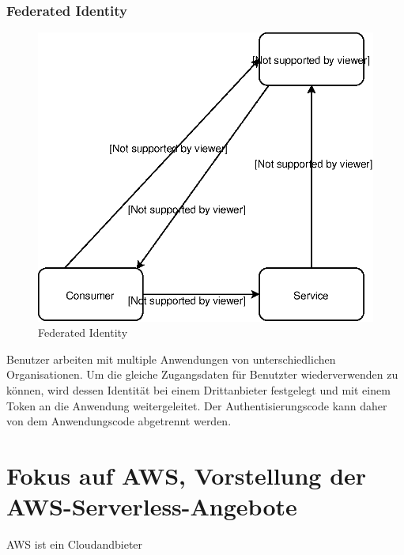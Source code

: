 \documentclass[
12pt,
english,
ngerman,
headsepline,
twoside,
openright,
numbers=noenddot,version=first
]{scrreprt}
\begin{document}
\subsection{Federated Identity}
\begin{figure}
	\includegraphics[scale=0.36]{./pics/pattern-federated-identity.eps}
	\caption{Federated Identity}
	\label{pic:federated-identity}
\end{figure}
Benutzer arbeiten mit multiple Anwendungen von unterschiedlichen Organisationen. Um die gleiche Zugangsdaten für Benutzter wiederverwenden zu können, wird dessen Identität bei einem Drittanbieter festgelegt und mit einem Token an die Anwendung weitergeleitet. Der Authentisierungscode kann daher von dem Anwendungscode abgetrennt werden.

\chapter{Fokus auf AWS, Vorstellung der AWS-Serverless-Angebote}
\label{chap:aws-serverless}
\acrshort{AWS} ist ein Cloudandbieter
\end{document}
